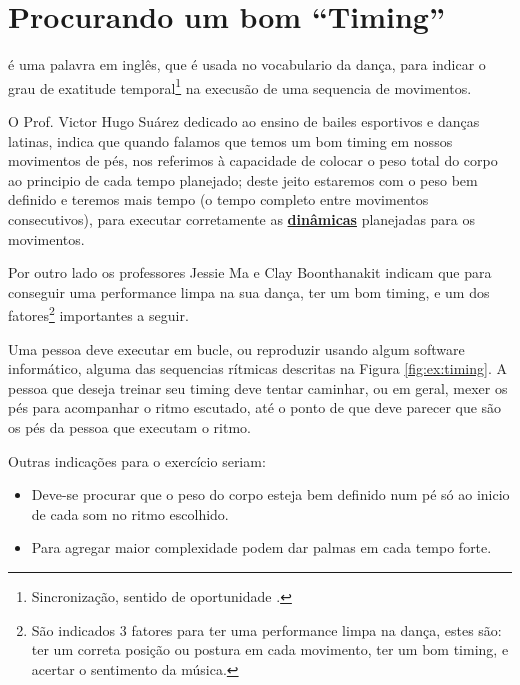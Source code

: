 
\section{Procurando um bom ``Timing''}
\label{sec:dancetimming}

\begin{definition}[Timing]
é uma palavra em inglês, que é usada no vocabulario da dança, 
para indicar o grau de exatitude temporal\footnote{%
Sincronização,
sentido de oportunidade \cite{TimingDef}.} 
na execusão de uma sequencia de movimentos.%
\end{definition}

O Prof. Victor Hugo Suárez dedicado ao ensino de bailes esportivos e danças latinas,
indica que quando falamos que temos um bom timing \cite{TimingDef2} em nossos movimentos de pés, 
nos referimos à capacidade de colocar o peso total do corpo ao principio de cada tempo planejado;
deste jeito estaremos com o peso bem definido e teremos mais tempo 
(o tempo completo entre movimentos  consecutivos), 
para executar corretamente as \hyperref[sec:musicalidade:dinamicas]{\textbf{dinâmicas}} 
planejadas para os movimentos.

Por outro lado os professores Jessie Ma e Clay Boonthanakit
indicam \cite{TimingDef3} que para conseguir uma performance limpa na sua dança,
ter um bom timing, e
um dos fatores\footnote{São indicados 3 fatores para ter uma performance limpa na dança,
estes são: ter um correta posição ou postura em cada movimento, ter um bom timing, e 
acertar o sentimento da música.} importantes a seguir.

\begin{example}
\label{ex:timing1}
Uma pessoa deve executar em bucle, ou reproduzir usando algum software informático,
alguma das sequencias rítmicas descritas na Figura \ref{fig:ex:timing}.
A pessoa que deseja treinar seu timing deve tentar caminhar, ou em geral, 
mexer os pés para acompanhar o ritmo escutado,
até o ponto de que deve parecer que são os pés da pessoa que executam o ritmo.

Outras indicações para o exercício seriam:
\begin{itemize}
\item Deve-se procurar que o peso do corpo esteja bem definido num pé só 
ao inicio de cada som no ritmo escolhido.
\item Para agregar maior complexidade podem dar palmas em cada tempo forte.
\end{itemize}
\end{example}


